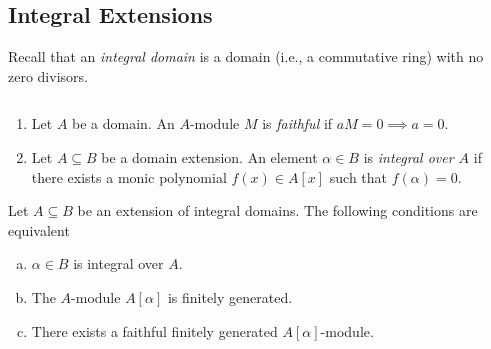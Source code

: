 \subsection{Integral Extensions}

Recall that an \textsl{integral domain} is a domain (i.e., a commutative ring) with no zero divisors.

\begin{defns}${}$
    \begin{enumerate}[-]
        \item Let $A$ be a domain. An $A$-module $M$ is \textsl{faithful} if $aM=0\implies a=0$. 

        \item Let $A\subseteq B$ be a domain extension. An element $\alpha\in B$ is \textsl{integral over $A$} if there exists a monic polynomial $f(x)\in A[x]$ such that $f(\alpha)=0$.
    \end{enumerate}
\end{defns}

\begin{thm}\label{thm:integral-equivalences}
    Let\/ $A\subseteq B$ be an extension of integral domains. The following conditions are equivalent
    \begin{enumerate}[a), font=\upshape]
        \item $\alpha\in B$ is integral over\/ $A$.
        \item The\/ $A$-module\/ $A[\alpha]$ is finitely generated.
        \item There exists a faithful finitely generated\/ $A[\alpha]$-module.
    \end{enumerate}
\end{thm}

